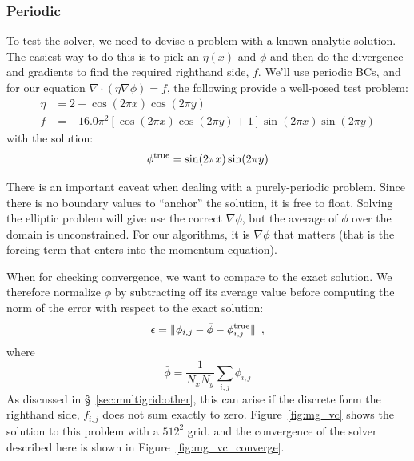 \subsubsection{Periodic}

To test the solver, we need to devise a problem with a known analytic
solution.  The easiest way to do this is to pick an $\eta(x)$ and
$\phi$ and then do the divergence and gradients to find the required
righthand side, $f$.  We'll use periodic BCs, and for our
equation $\nabla \cdot ( \eta \nabla \phi ) = f$, the following
provide a well-posed test problem:
\begin{align}
\eta &= 2 + \cos(2\pi x) \cos(2\pi y)  \label{eq:vc:lap}
\\
f &= -16.0 \pi^2 \left [ \cos(2\pi x)\cos(2\pi y) + 1 \right ] \sin(2\pi x)\sin(2 \pi y) \nonumber
\end{align}
with the solution:
\begin{equation}
\phi^\mathrm{true} = \sin(2 \pi x) \sin(2\pi y) \nonumber \\
\end{equation}

There is an important caveat when dealing with a purely-periodic
problem.  Since there is no boundary values to ``anchor'' the solution,
it is free to float.  Solving the elliptic problem will give use the
correct $\nabla \phi$, but the average of $\phi$ over the domain is 
unconstrained.  For our algorithms, it is $\nabla \phi$ that matters
(that is the forcing term that enters into the momentum equation).

When for checking convergence, we want to compare to the exact solution.
We therefore normalize $\phi$ by subtracting off its average value before
computing the norm of the error with respect to the exact solution:
\begin{equation}
\epsilon = \| \phi_{i,j} - \bar{\phi} - \phi^\mathrm{true}_{i,j} \| \enskip ,
\end{equation}
where
\begin{equation}
\bar{\phi} = \frac{1}{N_x N_y} \sum_{i,j} \phi_{i,j}
\end{equation}
As discussed in \S~\ref{sec:multigrid:other}, this can arise if
the discrete form the righthand side, $f_{i,j}$ does not sum exactly
to zero.  Figure~\ref{fig:mg_vc} shows the solution to this problem
with a $512^2$ grid. and the convergence of the solver described
here is shown in Figure~\ref{fig:mg_vc_converge}.

